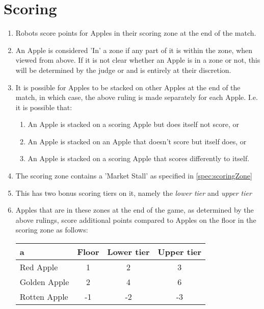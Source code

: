 \section{Scoring}
\label{sec:scoring}
\begin{enumerate}
      \item Robots score points for Apples in their scoring zone at the end of the match.
      \item An Apple is considered 'In' a zone if any part of it is within the zone, when
            viewed from above. If it is not clear whether an Apple is in a zone or not, this
            will be determined by the judge or \staff and is entirely at their discretion.
      \item It is possible for Apples to be stacked on other Apples at the end of the match,
            in which case, the above ruling is made separately for each Apple.
            I.e. it is possible that:
            \begin{enumerate}
                  \item An Apple is stacked on a scoring Apple but does itself not score, or
                  \item An Apple is stacked on an Apple that doesn't score but itself does, or
                  \item An Apple is stacked on a scoring Apple that scores differently to itself.
            \end{enumerate}
      \item The scoring zone contains a 'Market Stall' as specified in \ref{spec:scoringZone}
      \item This has two bonus scoring tiers on it, namely the \emph{lower tier} and \emph{upper tier}
      \item Apples that are in these zones at the end of the game, as determined by the above rulings,
            score additional points compared to Apples on the floor in the scoring zone as follows:
      \begin{center}
            \begin{tabular}{lccc}
                  \toprule
                  a   &    Floor   &   Lower tier   &  Upper tier  \\
                  \midrule
                  Red Apple    &    1       &       2        &      3       \\
                  Golden Apple &    2       &       4        &      6       \\
                  Rotten Apple &   -1       &      -2        &     -3       \\
                  \bottomrule
            \end{tabular}
      \end{center}
\end{enumerate}

